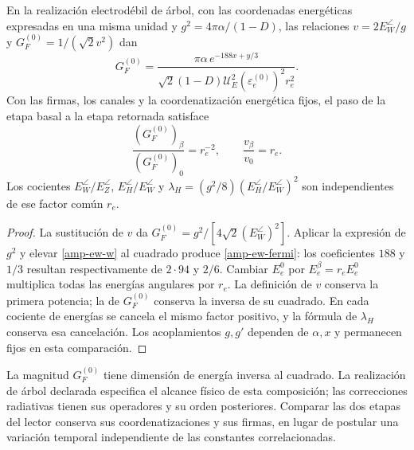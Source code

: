 \begin{proposition}
En la realización electrodébil de árbol, con las coordenadas energéticas
expresadas en una misma unidad y $g^2=4\pi\alpha/(1-D)$, las relaciones
$v=2E_W^\angle/g$ y $G_F^{(0)}=1/(\sqrt2v^2)$ dan
\begin{equation}
 G_F^{(0)}=
 \frac{\pi\alpha\,e^{-188x+y/3}}
 {\sqrt2(1-D)\mathcal U_E^2(\varepsilon_e^{(0)})^2r_e^2}.
 \label{amp-ew-fermi}
\end{equation}
Con las firmas, los canales y la coordenatización energética fijos, el paso de la
etapa basal a la etapa retornada satisface
\begin{equation}
 \frac{(G_F^{(0)})_\beta}{(G_F^{(0)})_0}=r_e^{-2},\qquad
 \frac{v_\beta}{v_0}=r_e.
 \label{amp-ew-escala}
\end{equation}
Los cocientes $E_W^\angle/E_Z^\angle$, $E_H^\angle/E_W^\angle$ y
$\lambda_H=(g^2/8)(E_H^\angle/E_W^\angle)^2$ son independientes de
ese factor común $r_e$.
\end{proposition}
\begin{proof}
La sustitución de $v$ da $G_F^{(0)}=g^2/[4\sqrt2(E_W^\angle)^2]$.
Aplicar la expresión de $g^2$ y elevar \eqref{amp-ew-w} al cuadrado
produce \eqref{amp-ew-fermi}: los coeficientes $188$ y $1/3$ resultan
respectivamente de $2\cdot94$ y $2/6$. Cambiar $E_e^0$ por
$E_e^\beta=r_eE_e^0$ multiplica todas las energías angulares por $r_e$.
La definición de $v$ conserva la primera potencia; la de $G_F^{(0)}$
conserva la inversa de su cuadrado. En cada cociente de energías se
cancela el mismo factor positivo, y la fórmula de $\lambda_H$ conserva
esa cancelación. Los acoplamientos $g,g'$ dependen de $\alpha,x$ y
permanecen fijos en esta comparación.
\end{proof}

La magnitud $G_F^{(0)}$ tiene dimensión de energía inversa al cuadrado.
La realización de árbol declarada especifica el alcance físico de esta
composición; las correcciones radiativas tienen sus operadores y su orden
posteriores. Comparar las dos etapas del lector conserva sus coordenatizaciones y
sus firmas, en lugar de postular una variación temporal independiente de
las constantes correlacionadas.


